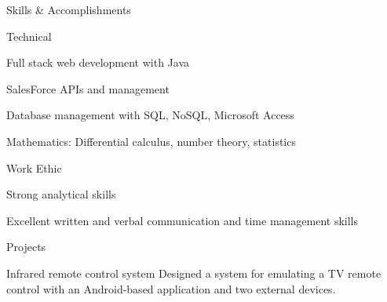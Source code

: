 \documentclass{resume} %
\begin{document}

\begin{rSection}{Skills \& Accomplishments}
	\begin{rSubQualificationsSection}{Technical}
		\item Full stack web development with Java
		\item SalesForce APIs and management
		\item Database management with SQL, NoSQL, Microsoft Access
		\item Mathematics: Differential calculus, number theory, statistics	
	\end{rSubQualificationsSection}

	\begin{rSubQualificationsSection}{Work Ethic}
		\item Strong analytical skills
		\item Excellent written and verbal communication and time management skills
	\end{rSubQualificationsSection}
	

	\begin{rSubsection}{Projects}
		\begin{rProject}{Infrared remote control system}
			Designed a system for emulating a TV remote control with an Android-based application and two external devices. 
		\end{rProject}
	\end{rSubsection}
\end{rSection}
\end{document}
